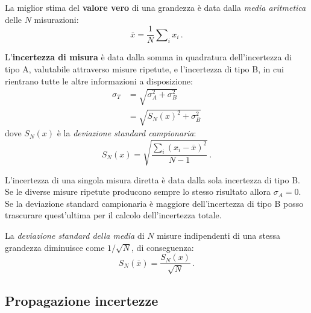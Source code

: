 \documentclass[titlepage]{article}
\numberwithin{equation}{section}
\numberwithin{figure}{section}
\numberwithin{table}{section}
\begin{document}
La miglior stima del \textbf{valore vero} di una grandezza è data dalla \textit{media aritmetica} delle $N$ misurazioni:
\begin{equation}
  \overline{x} = \frac{1}{N} \sum\nolimits_{i} x_i \,.
\end{equation}

L'\textbf{incertezza di misura} è data dalla somma in quadratura dell'incertezza di tipo A, valutabile attraverso misure ripetute, e l'incertezza di tipo B, in cui rientrano tutte le altre informazioni a disposizione:
\begin{align}
  \sigma_T &= \sqrt{\sigma_A^2 + \sigma_B^2} \nonumber \\
  &= \sqrt{S_N(x)^2 + \sigma_B^2}
\end{align}
dove $S_N(x)$ è la \textit{deviazione standard campionaria}:
\begin{equation}
  S_N(x) = \sqrt{\frac{\sum_i (x_i - \overline{x})^2}{N - 1}} \,.
\end{equation}

L'incertezza di una singola misura diretta è data dalla sola incertezza di tipo B. Se le diverse misure ripetute producono sempre lo stesso risultato allora $\sigma_A = 0$. Se la deviazione standard campionaria è maggiore dell'incertezza di tipo B posso trascurare quest'ultima per il calcolo dell'incertezza totale.

La \textit{deviazione standard della media} di $N$ misure indipendenti di una stessa grandezza diminuisce come $1 / \sqrt{N}$, di conseguenza:
\begin{equation}
  S_N(\overline{x}) = \frac{S_N(x)}{\sqrt{N}} \,.
\end{equation}

\subsection{Propagazione incertezze}
\end{document}
